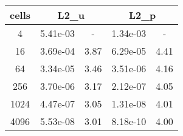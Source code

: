 \documentclass[10pt]{report}
\begin{document}
\begin{table}[H]
\begin{center}
\begin{tabular}{|c|c|c|c|c|} \hline
cells & 
\multicolumn{2}{|c|}{L2_u} & 
\multicolumn{2}{|c|}{L2_p}\\ \hline
4 & 5.41e-03 & - & 1.34e-03 & -\\ \hline
16 & 3.69e-04 & 3.87 & 6.29e-05 & 4.41\\ \hline
64 & 3.34e-05 & 3.46 & 3.51e-06 & 4.16\\ \hline
256 & 3.70e-06 & 3.17 & 2.12e-07 & 4.05\\ \hline
1024 & 4.47e-07 & 3.05 & 1.31e-08 & 4.01\\ \hline
4096 & 5.53e-08 & 3.01 & 8.18e-10 & 4.00\\ \hline
\end{tabular}
\end{center}
\end{table}
\end{document}

